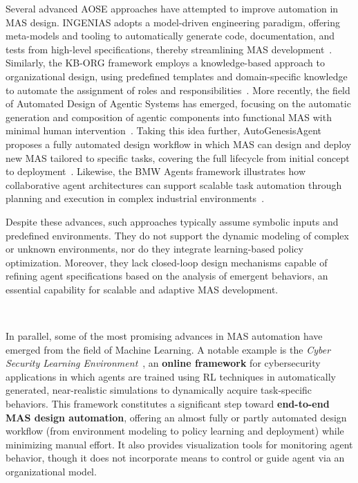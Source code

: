 \documentclass[pdflatex,sn-mathphys-num]{sn-jnl}%
\theoremstyle{thmstyleone}%
\theoremstyle{thmstyletwo}%
\theoremstyle{thmstylethree}%
\begin{document}
Several advanced AOSE approaches have attempted to improve automation in MAS design. INGENIAS adopts a model-driven engineering paradigm, offering meta-models and tooling to automatically generate code, documentation, and tests from high-level specifications, thereby streamlining MAS development~\cite{Pavon2003}. Similarly, the KB-ORG framework employs a knowledge-based approach to organizational design, using predefined templates and domain-specific knowledge to automate the assignment of roles and responsibilities~\cite{Sims2008}. More recently, the field of Automated Design of Agentic Systems has emerged, focusing on the automatic generation and composition of agentic components into functional MAS with minimal human intervention~\cite{smith2024automated}. Taking this idea further, AutoGenesisAgent proposes a fully automated design workflow in which MAS can design and deploy new MAS tailored to specific tasks, covering the full lifecycle from initial concept to deployment~\cite{harper2024autogenesisagent}. Likewise, the BMW Agents framework illustrates how collaborative agent architectures can support scalable task automation through planning and execution in complex industrial environments~\cite{crawford2024bmw}.

Despite these advances, such approaches typically assume symbolic inputs and predefined environments. They do not support the dynamic modeling of complex or unknown environments, nor do they integrate learning-based policy optimization. Moreover, they lack closed-loop design mechanisms capable of refining agent specifications based on the analysis of emergent behaviors, an essential capability for scalable and adaptive MAS development.

\

\noindent In parallel, some of the most promising advances in MAS automation have emerged from the field of Machine Learning. A notable example is the \textit{Cyber Security Learning Environment}~\cite{hammar2023scalable}, an \textbf{online framework} for cybersecurity applications in which agents are trained using RL techniques in automatically generated, near-realistic simulations to dynamically acquire task-specific behaviors. This framework constitutes a significant step toward \textbf{end-to-end MAS design automation}, offering an almost fully or partly automated design workflow (from environment modeling to policy learning and deployment) while minimizing manual effort. It also provides visualization tools for monitoring agent behavior, though it does not incorporate means to control or guide agent via an organizational model.
\end{document}
